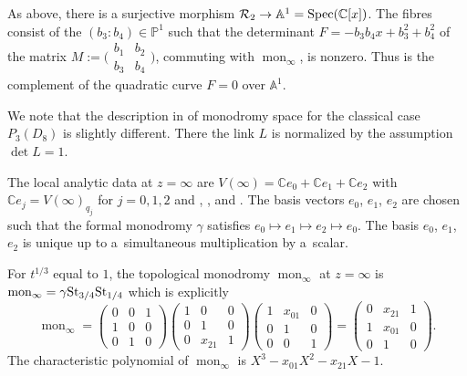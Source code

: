 \documentclass[pdftex]{sigma}
\numberwithin{equation}{section}
\begin{document}
As above, there is a surjective morphism $\mathcal{R}_2\rightarrow \mathbb{A}^1={\rm Spec}(\mathbb{C}[x])$. The fibres consist of the $(b_3:b_4)\in \mathbb{P}^1$ such that the determinant
 $F=-b_3b_4x + b_3^2 + b_4^2$ of the matrix $M:=\bigl(\begin{smallmatrix}b_1 &b_2\\ b_3& b_4\end{smallmatrix}\bigr)$,
 commuting with $\operatorname{mon}_\infty$, is nonzero. Thus  is the complement of the quadratic curve $F=0$ over $\mathbb{A}^1$.

 We note that the description in \cite[Section~3.6]{vdP-Sa} of monodromy space for the classical case~$P_{3}(D_8)$ is slightly different.
 There the link $L$ is normalized by the assumption $\det L=1$.

\begin{Example} The local analytic data at $z=\infty$ are
$V(\infty)=\mathbb{C}e_0+\mathbb{C}e_1+\mathbb{C}e_2$
with $\mathbb{C}e_j=V(\infty)_{q_j}$ for $j=0,1,2$ and , ,  and
. The basis vectors $e_0$, $e_1$, $e_2$ are chosen such that
 the formal monodromy $\gamma$ satisfies $e_0\mapsto e_1\mapsto e_2\mapsto e_0$.
 The basis $e_0$, $e_1$, $e_2$ is unique up to a~simultaneous multiplication by a~scalar.
\end{Example}
For $t^{1/3}$ equal to $1$, the topological monodromy $\operatorname{mon}_\infty$ at $z=\infty$
is $\operatorname{mon}_{\infty}=\gamma {\rm St}_{3/4} {\rm St}_{1/4}$ which is explicitly
\[\operatorname{mon}_\infty=\begin{pmatrix}0 &0 &1 \\ 1&0 &0 \\ 0&1 &0 \end{pmatrix}
\begin{pmatrix}1 &0 &0 \\ 0& 1&0 \\ 0& x_{21}&1 \end{pmatrix}
\begin{pmatrix}1&x_{01} &0 \\ 0&1 &0 \\ 0& 0&1 \end{pmatrix}=
\begin{pmatrix} 0&x_{21} &1 \\ 1&x_{01} &0 \\ 0& 1&0 \end{pmatrix}.\]
 The characteristic polynomial of $\operatorname{mon}_\infty$ is $X^3-x_{01}X^2-x_{21}X-1$.
\end{document}
